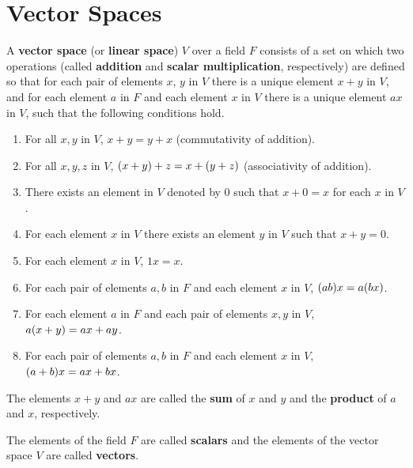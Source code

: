\section{Vector Spaces}\label{sec:1.2}

\begin{defn}\label{1.2.1}
    A \textbf{vector space} (or \textbf{linear space}) \(V\) over a field \(F\) consists of a set on which two operations (called \textbf{addition} and \textbf{scalar multiplication}, respectively) are defined so that for each pair of elements \(x\), \(y\) in \(V\) there is a unique element \(x + y\) in \(V\), and for each element \(a\) in \(F\) and each element \(x\) in \(V\) there is a unique element \(ax\) in \(V\), such that the following conditions hold.
    \begin{enumerate}[label=(VS \arabic*), ref=VS \arabic*]
        \item \label{1.2.1.1}
              For all \(x, y\) in \(V\), \(x + y = y + x\)
              (commutativity of addition).
        \item \label{1.2.1.2}
              For all \(x, y, z\) in \(V\), \(\left\lparen x + y\right\rparen + z = x + \left\lparen y + z\right\rparen\)
              (associativity of addition).
        \item \label{1.2.1.3}
              There exists an element in \(V\) denoted by \(0\) such that \(x + 0 = x\) for each \(x\) in \(V\).
        \item \label{1.2.1.4}
              For each element \(x\) in \(V\) there exists an element \(y\) in \(V\) such that \(x + y = 0\).
        \item \label{1.2.1.5}
              For each element \(x\) in \(V\), \(1x = x\).
        \item \label{1.2.1.6}
              For each pair of elements \(a, b\) in \(F\) and each element \(x\) in \(V\), \(\p{ab} x = a \p{bx}\).
        \item \label{1.2.1.7}
              For each element \(a\) in \(F\) and each pair of elements \(x, y\) in \(V\), \(a \p{x + y} = ax + ay\).
        \item \label{1.2.1.8}
              For each pair of elements \(a, b\) in \(F\) and each element \(x\) in \(V\), \(\p{a + b} x = ax + bx\).
    \end{enumerate}
    The elements \(x + y\) and \(ax\) are called the \textbf{sum} of \(x\) and \(y\) and the \textbf{product} of \(a\) and \(x\), respectively.
\end{defn}

\begin{defn}\label{1.2.2}
    The elements of the field \(F\) are called \textbf{scalars} and the elements of the vector space \(V\) are called \textbf{vectors}.
\end{defn}

